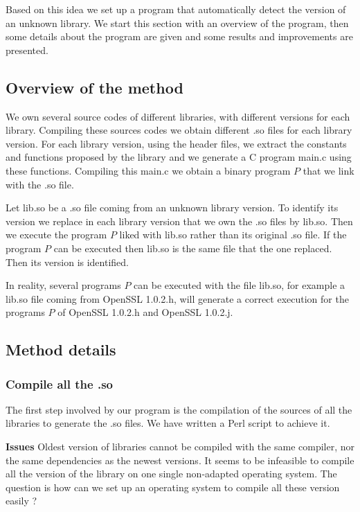 \documentclass{article}
\begin{document}
    Based on this idea we set up a program that automatically detect the version of an
    unknown library. We start this section with an overview of the program, then
    some details about the program are given and some results and improvements are
    presented.

	\subsection{Overview of the method}
   
    We own several source codes of different libraries, with different
    versions for each library. Compiling these sources codes we obtain
    different .so files for each library version.  For each library version,
    using the header files, we extract the constants and functions proposed by
    the library and we generate a C program main.c using these functions.
    Compiling this main.c we obtain a binary program $P$ that we link with the
    .so file.


    Let lib.so be a .so file coming from an unknown library version. To
    identify its version we replace in each library version that we own the
    .so files by lib.so. Then we execute the program $P$ liked with lib.so
    rather than its original .so file.  If the program $P$ can be executed
    then lib.so is the same file that the one replaced. Then its version is
    identified.
 
    In reality, several programs $P$ can be executed with the file lib.so, for
    example a lib.so file coming from OpenSSL 1.0.2.h, will generate a correct
    execution for the programs $P$ of OpenSSL 1.0.2.h and OpenSSL 1.0.2.j.
		
    \subsection{Method details}
	\subsubsection{Compile all the .so}
	
    The first step involved by our program is the compilation of the sources
    of all the libraries to generate the .so files. We have written a Perl
    script to achieve it.
	
    \textbf{Issues} Oldest version of libraries cannot be compiled with the
    same compiler, nor the same dependencies as the newest versions. It seems
    to be infeasible to compile all the version of the library on one single
    non-adapted operating system. The question is how can we set up an
    operating system to compile all these version easily ?
	
\end{document}
